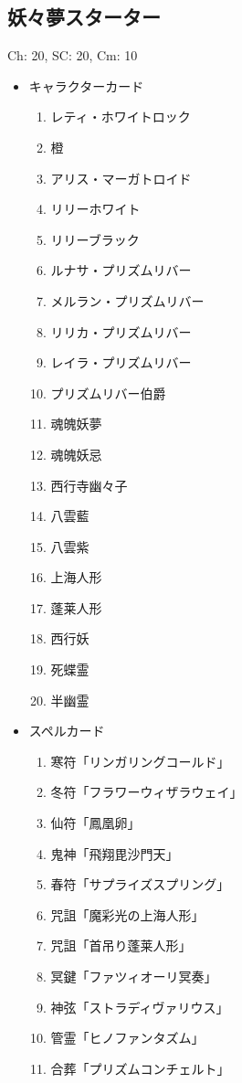 \documentclass[line_length=22zw,number_of_lines=45,twocolumn]{jlreq}
\begin{document}
\subsection{妖々夢スターター}
Ch: 20, SC: 20, Cm: 10
\begin{itemize}
	\item キャラクターカード
		\begin{enumerate}
			\item レティ・ホワイトロック
			\item 橙
			\item アリス・マーガトロイド
			\item リリーホワイト
			\item リリーブラック
			\item ルナサ・プリズムリバー
			\item メルラン・プリズムリバー
			\item リリカ・プリズムリバー
			\item レイラ・プリズムリバー
			\item プリズムリバー伯爵
			\item 魂魄妖夢
			\item 魂魄妖忌
			\item 西行寺幽々子
			\item 八雲藍
			\item 八雲紫
			\item 上海人形
			\item 蓬莱人形
			\item 西行妖
			\item 死蝶霊
			\item 半幽霊
		\end{enumerate}
	\item スペルカード
		\begin{enumerate}
			\item 寒符「リンガリングコールド」
			\item 冬符「フラワーウィザラウェイ」
			\item 仙符「鳳凰卵」
			\item 鬼神「飛翔毘沙門天」
			\item 春符「サプライズスプリング」
			\item 咒詛「魔彩光の上海人形」
			\item 咒詛「首吊り蓬莱人形」
			\item 冥鍵「ファツィオーリ冥奏」
			\item 神弦「ストラディヴァリウス」
			\item 管霊「ヒノファンタズム」
			\item 合葬「プリズムコンチェルト」

\end{enumerate}
\end{itemize}
\end{document}
